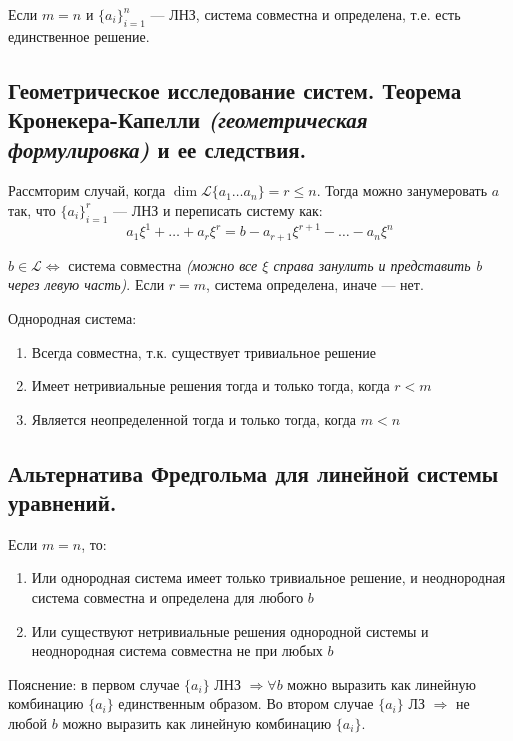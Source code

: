\begin{theorem}
    Если $m=n$ и $\{a_i\}_{i=1}^n$ --- ЛНЗ, система совместна и определена, т.е. есть единственное решение.
\end{theorem}
\subsection{Геометрическое исследование систем. Теорема Кронекера-Капелли \textit{(геометрическая формулировка)} и ее следствия.}
Рассмторим случай, когда $\dim\mathcal{L}\{a_1\ldots a_n\}=r\leq n$. Тогда можно занумеровать $a$ так, что $\{a_i\}_{i=1}^r$ --- ЛНЗ и переписать систему как: $$a_1\xi^1+\ldots+a_r\xi^r=b-a_{r+1}\xi^{r+1}-\ldots-a_n\xi^n$$
\begin{theorem}
    $b\in\mathcal L \Leftrightarrow$ система совместна \textit{(можно все $\xi$ справа занулить и представить b через левую часть)}. Если $r=m$, система определена, иначе --- нет.
\end{theorem}
\begin{consequence}
    Однородная система:
    \begin{enumerate}
        \item Всегда совместна, т.к. существует тривиальное решение
        \item Имеет нетривиальные решения тогда и только тогда, когда $r<m$
        \item Является неопределенной тогда и только тогда, когда $m<n$
    \end{enumerate}
\end{consequence}
\subsection{Альтернатива Фредгольма для линейной системы уравнений.}
\begin{theorem}
    Если $m=n$, то:
    \begin{enumerate}
        \item Или однородная система имеет только тривиальное решение, и неоднородная система совместна и определена для любого $b$
        \item Или существуют нетривиальные решения однородной системы и неоднородная система совместна не при любых $b$
    \end{enumerate}
    Пояснение: в первом случае $\{a_i\}$ ЛНЗ $\Rightarrow \forall b$ можно выразить как линейную комбинацию $\{a_i\}$ единственным образом. Во втором случае $\{a_i\}$ ЛЗ $\Rightarrow$ не любой $b$ можно выразить как линейную комбинацию $\{a_i\}$.
\end{theorem}
